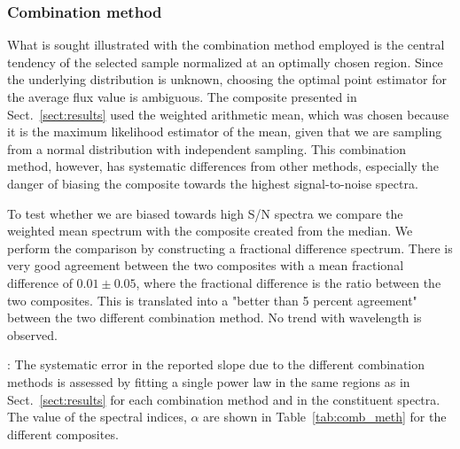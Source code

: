 \documentclass{aa}    %
\newcommand{\Tab}[1]{Table~\ref{tab:#1}}
\newcommand{\tab}[1]{\Tab{#1}}
\newcommand{\sectionname}{Sect.}
\newcommand{\Sect}[1]{\sectionname~\ref{sect:#1}}
\newcommand{\sect}[1]{\Sect{#1}}
\newcommand{\sectlabel}[1]{\label{sect:#1}}
\newcommand{\todo}[3]{{\color{#2}\emph{#1}: #3}}
\newcommand{\changed}[1]{\todo{}{green}{#1}}
\begin{document}
{%
%



\subsubsection{Combination method}  \sectlabel{Combination method}
What is sought illustrated with the combination method employed is the central tendency of the selected sample normalized at an optimally chosen region. Since the underlying distribution is unknown, choosing the optimal point estimator for the average flux value is ambiguous. The composite presented in \sect{results} used the weighted arithmetic mean, which was chosen because it is the maximum likelihood estimator of the mean, given that we are sampling from a normal distribution with independent sampling. This combination method, however, has systematic differences from other methods, especially the danger of biasing the composite towards the highest signal-to-noise spectra. 

To test whether we are biased towards high S/N spectra we compare the weighted mean spectrum with the composite created from the median. We perform the comparison by constructing a fractional difference spectrum. There is very good agreement between the two composites with a mean fractional difference of $0.01 \pm 0.05$, where the fractional difference is the ratio between the two composites. This is translated into a "better than 5 percent agreement" between the two different combination method. No trend with wavelength is observed.

\changed{
The systematic error in the reported slope due to the different combination methods is assessed by fitting a single power law in the same regions as in \sect{results} for each combination method and in the constituent spectra. The value of the spectral indices, $\alpha$ are shown in \tab{comb_meth} for the different composites.

}}
\end{document}
